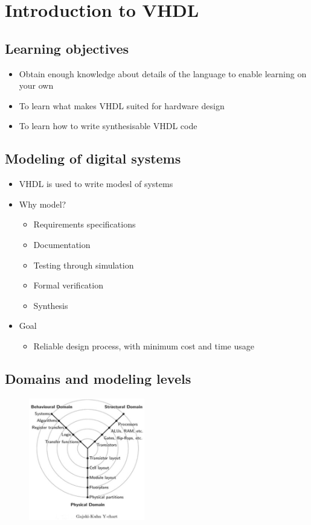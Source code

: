 \documentclass[a4paper,11pt,norsk]{article}
\begin{document}


\section{Introduction to VHDL}
\subsection{Learning objectives}
\begin{itemize}
    \item Obtain enough knowledge about details of the language to enable learning on your own
    \item To learn what makes VHDL suited for hardware design
    \item To learn how to write synthesisable VHDL code
\end{itemize}

\subsection{Modeling of digital systems}
\begin{itemize}
    \item VHDL is used to write modesl of systems 
    \item Why model?
        \begin{itemize}
            \item Requirements specifications 
            \item Documentation
            \item Testing through simulation
            \item Formal verification
            \item Synthesis
        \end{itemize}
    \item Goal
        \begin{itemize}
            \item Reliable design process, with minimum cost and time usage
        \end{itemize}
\end{itemize}

\subsection{Domains and modeling levels}
\begin{figure}[H]
    \centering
    \includegraphics[width=0.45\textwidth]{imgs/ychart.jpeg}
\end{figure}
\end{document}
